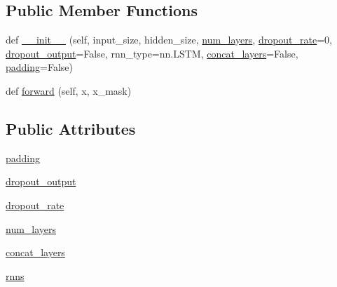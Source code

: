 \subsection*{Public Member Functions}
\begin{DoxyCompactItemize}
\item 
def \hyperlink{classparlai_1_1agents_1_1drqa_1_1layers_1_1StackedBRNN_ac2e446b2811a6a62ce19f5bb511f6a74}{\+\_\+\+\_\+init\+\_\+\+\_\+} (self, input\+\_\+size, hidden\+\_\+size, \hyperlink{classparlai_1_1agents_1_1drqa_1_1layers_1_1StackedBRNN_a5a3f2c30cf13a1db1242b3870589554f}{num\+\_\+layers}, \hyperlink{classparlai_1_1agents_1_1drqa_1_1layers_1_1StackedBRNN_a0d9b1ee6b2a24c349e35821cf689b6e4}{dropout\+\_\+rate}=0, \hyperlink{classparlai_1_1agents_1_1drqa_1_1layers_1_1StackedBRNN_ae40607cb097234025ead5baa817b1a43}{dropout\+\_\+output}=False, rnn\+\_\+type=nn.\+L\+S\+TM, \hyperlink{classparlai_1_1agents_1_1drqa_1_1layers_1_1StackedBRNN_aa70222a319180cce80be6827c07d391a}{concat\+\_\+layers}=False, \hyperlink{classparlai_1_1agents_1_1drqa_1_1layers_1_1StackedBRNN_a0639e785d34232babbaebf8c5be1e8e9}{padding}=False)
\item 
def \hyperlink{classparlai_1_1agents_1_1drqa_1_1layers_1_1StackedBRNN_a77f43de1cd3b3461c3ce791973aa9eb5}{forward} (self, x, x\+\_\+mask)
\end{DoxyCompactItemize}
\subsection*{Public Attributes}
\begin{DoxyCompactItemize}
\item 
\hyperlink{classparlai_1_1agents_1_1drqa_1_1layers_1_1StackedBRNN_a0639e785d34232babbaebf8c5be1e8e9}{padding}
\item 
\hyperlink{classparlai_1_1agents_1_1drqa_1_1layers_1_1StackedBRNN_ae40607cb097234025ead5baa817b1a43}{dropout\+\_\+output}
\item 
\hyperlink{classparlai_1_1agents_1_1drqa_1_1layers_1_1StackedBRNN_a0d9b1ee6b2a24c349e35821cf689b6e4}{dropout\+\_\+rate}
\item 
\hyperlink{classparlai_1_1agents_1_1drqa_1_1layers_1_1StackedBRNN_a5a3f2c30cf13a1db1242b3870589554f}{num\+\_\+layers}
\item 
\hyperlink{classparlai_1_1agents_1_1drqa_1_1layers_1_1StackedBRNN_aa70222a319180cce80be6827c07d391a}{concat\+\_\+layers}
\item 
\hyperlink{classparlai_1_1agents_1_1drqa_1_1layers_1_1StackedBRNN_a122616c972deeb4368a9b4115650e9dc}{rnns}
\end{DoxyCompactItemize}


